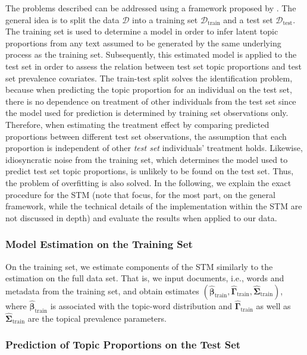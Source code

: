The problems described can be addressed using a framework proposed by \cite{egami2018make}. The general idea is to split the data $\mathcal{D}$ into a training set $\mathcal{D}_{\text{train}}$ and a test set $\mathcal{D}_{\text{test}}$. The training set is used to determine a model in order to infer latent topic proportions from any text assumed to be generated by the same underlying process as the training set. Subsequently, this estimated model is applied to the test set in order to assess the relation between test set topic proportions and test set prevalence covariates. The train-test split solves the identification problem, because when predicting the topic proportion for an individual on the test set, there is no dependence on treatment of other individuals from the test set since the model used for prediction is determined by training set observations only. Therefore, when estimating the treatment effect by comparing predicted proportions between different test set observations, the assumption that each proportion is independent of other \textit{test set} individuals' treatment holds. Likewise, idiosyncratic noise from the training set, which determines the model used to predict test set topic proportions, is unlikely to be found on the test set. Thus, the problem of overfitting is also solved. In the following, we explain the exact procedure for the STM (note that \cite{egami2018make} focus, for the most part, on the general framework, while the technical details of the implementation within the STM are not discussed in depth) and evaluate the results when applied to our data.

\subsubsection{Model Estimation on the Training Set}
\label{Model Estimation on the Training Set}

On the training set, we estimate components of the STM similarly to the estimation on the full data set. That is, we input documents, i.e., words and metadata from the training set, and obtain estimates $(\hat{\boldsymbol{\beta}}_{\text{train}}, \hat{\boldsymbol{\Gamma}}_{\text{train}}, \hat{\boldsymbol{\Sigma}}_{\text{train}})$, where $\hat{\boldsymbol{\beta}}_{\text{train}}$ is associated with the topic-word distribution and $\hat{\boldsymbol{\Gamma}}_{\text{train}}$ as well as $\hat{\boldsymbol{\Sigma}}_{\text{train}}$ are the topical prevalence parameters. 

\subsubsection{Prediction of Topic Proportions on the Test Set}
\label{Prediction of Topic Proportions on the Test Set}

